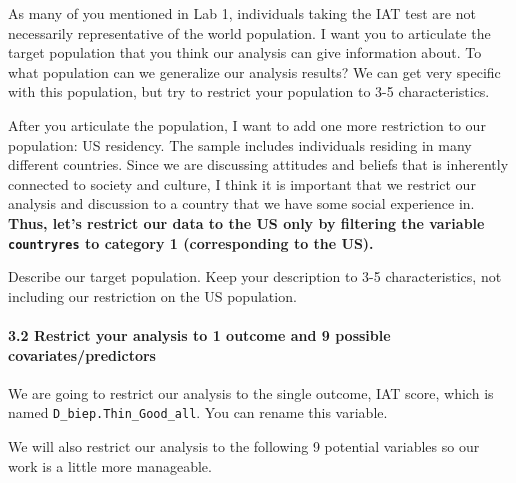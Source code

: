 \documentclass[
  letterpaper,
  DIV=11,
  numbers=noendperiod]{scrartcl}
\let\oldparagraph\paragraph
\renewcommand{\paragraph}[1]{\oldparagraph{#1}\mbox{}}
\begin{document}
As many of you mentioned in Lab 1, individuals taking the IAT test are
not necessarily representative of the world population. I want you to
articulate the target population that you think our analysis can give
information about. To what population can we generalize our analysis
results? We can get very specific with this population, but try to
restrict your population to 3-5 characteristics.

After you articulate the population, I want to add one more restriction
to our population: US residency. The sample includes individuals
residing in many different countries. Since we are discussing attitudes
and beliefs that is inherently connected to society and culture, I think
it is important that we restrict our analysis and discussion to a
country that we have some social experience in. \textbf{Thus, let's
restrict our data to the US only by filtering the variable
\texttt{countryres} to category 1 (corresponding to the US).}

\begin{tcolorbox}[enhanced jigsaw, left=2mm, opacitybacktitle=0.6, arc=.35mm, colback=white, colframe=quarto-callout-important-color-frame, bottomrule=.15mm, opacityback=0, toptitle=1mm, toprule=.15mm, titlerule=0mm, colbacktitle=quarto-callout-important-color!10!white, rightrule=.15mm, leftrule=.75mm, title=\textcolor{quarto-callout-important-color}{\faExclamation}\hspace{0.5em}{Task}, breakable, bottomtitle=1mm, coltitle=black]

Describe our target population. Keep your description to 3-5
characteristics, not including our restriction on the US population.

\end{tcolorbox}

\hypertarget{restrict-your-analysis-to-1-outcome-and-9-possible-covariatespredictors}{%
\paragraph{3.2 Restrict your analysis to 1 outcome and 9 possible
covariates/predictors}\label{restrict-your-analysis-to-1-outcome-and-9-possible-covariatespredictors}}

We are going to restrict our analysis to the single outcome, IAT score,
which is named \texttt{D\_biep.Thin\_Good\_all}. You can rename this
variable.

We will also restrict our analysis to the following 9 potential
variables so our work is a little more manageable.
\end{document}
